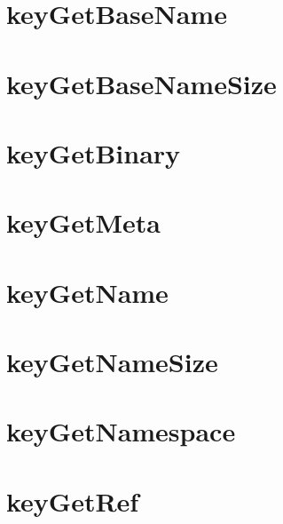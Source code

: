 \let\mypdfximage\pdfximage\def\pdfximage{\immediate\mypdfximage}\documentclass[twoside]{book}
\newcommand{\+}{\discretionary{\mbox{\scriptsize$\hookleftarrow$}}{}{}}
\begin{document}
\chapter{key\+Get\+Base\+Name}
\label{doc_contrib_api_reviews_core_keyGetBaseName_md}

\chapter{key\+Get\+Base\+Name\+Size}
\label{doc_contrib_api_reviews_core_keyGetBaseNameSize_md}

\chapter{key\+Get\+Binary}
\label{doc_contrib_api_reviews_core_keyGetBinary_md}

\chapter{key\+Get\+Meta}
\label{doc_contrib_api_reviews_core_keyGetMeta_md}

\chapter{key\+Get\+Name}
\label{doc_contrib_api_reviews_core_keyGetName_md}

\chapter{key\+Get\+Name\+Size}
\label{doc_contrib_api_reviews_core_keyGetNameSize_md}

\chapter{key\+Get\+Namespace}
\label{doc_contrib_api_reviews_core_keyGetNamespace_md}

\chapter{key\+Get\+Ref}
\label{doc_contrib_api_reviews_core_keyGetRef_md}

\end{document}
